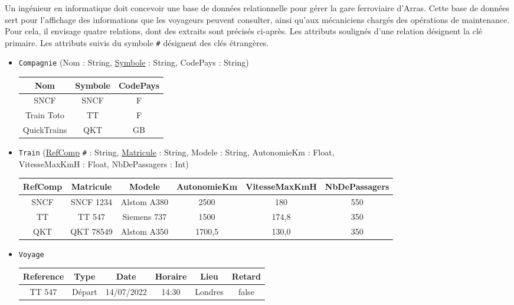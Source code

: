 \documentclass[11pt,a4paper,french,twoside]{PMCours}
\begin{document}
\medskip
Un ingénieur en informatique doit concevoir une base de données relationnelle pour gérer la gare ferroviaire d'Arras. Cette base de données sert pour l'affichage des informations  que les voyageurs peuvent consulter, ainsi qu'aux mécaniciens chargés des opérations de maintenance. Pour cela, il envisage quatre relations, dont des extraits sont précisés ci-après. Les attributs soulignés d'une relation désignent la clé primaire. Les attributs suivis du symbole \verb'#' désignent des clés étrangères.

\begin{itemize}
\item \verb'Compagnie' (Nom : String, \underline{Symbole} : String, CodePays : String)
\begin{center}
\begin{tabular}{|c|c|c|}\hline
Nom & Symbole & CodePays\\\hline
SNCF & SNCF & F\\\hline
Train Toto & TT & F\\\hline
QuickTrains & QKT & GB\\\hline
\end{tabular}
\end{center}
\item \verb'Train' (\underline{RefComp} \verb'#' : String, \underline{Matricule} : String, Modele : String, AutonomieKm : Float, \\VitesseMaxKmH : Float, NbDePassagers : Int)
\begin{center}
\begin{tabular}{|c|c|c|c|c|c|}\hline
RefComp & Matricule & Modele & AutonomieKm & VitesseMaxKmH & NbDePassagers\\\hline
SNCF & SNCF 1234 & Alstom A380 & 2500 & 180 & 550\\\hline
TT & TT 547 & Siemens 737 & 1500 & 174,8 & 350\\\hline
QKT & QKT 78549 & Alstom A350 & 1700,5 & 130,0 & 350\\\hline
\end{tabular}
\end{center}
\newpage
\item \verb'Voyage'
\begin{center}
\begin{tabular}{|c|c|c|c|c|c|}\hline
Reference & Type & Date & Horaire & Lieu & Retard\\\hline
TT 547 & Départ & 14/07/2022 & 14:30 & Londres & false\\\hline

\end{tabular}
\end{center}
\end{itemize}
\end{document}
